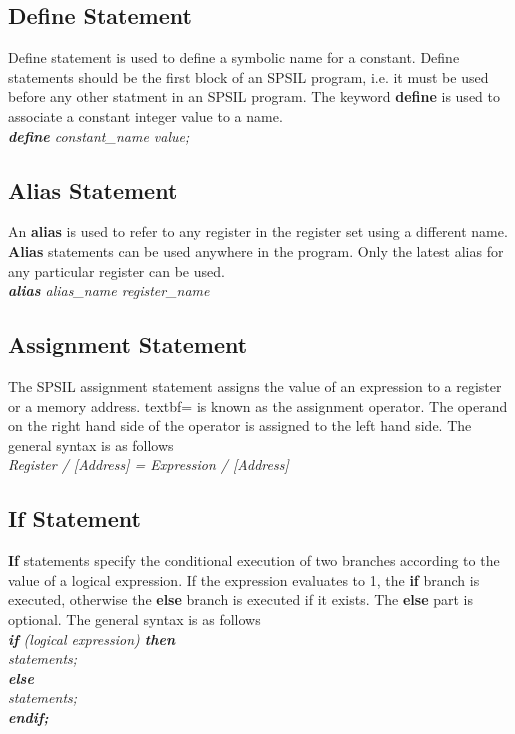 \documentclass[11pt]{article}
\begin{document}
\subsection{Define Statement}
Define statement is used to define a symbolic name for a constant. Define statements should be the first block of an SPSIL program, i.e. it must be  used before any other statment in an SPSIL program. The keyword \textbf{define} is used to associate a constant integer value to a name. \\

\textit{ \textbf{define} constant\_name value; }


\subsection{Alias Statement}
An \textbf{alias} is used to refer to any register in the register set using a different name. \textbf{Alias} statements can be used anywhere in the program. Only the latest alias for any particular register can be used.  \\
\indent \textit{ \textbf{alias}  alias\_name register\_name } \\


\subsection{Assignment Statement}
The SPSIL assignment statement assigns the value of an expression to a register  or a memory address. textbf{=} is known as the assignment operator. The operand on the right hand side of the operator is assigned to the left hand side. The general syntax is as follows \\

\indent \textit{ Register / [Address] = Expression / [Address] }


\subsection{If Statement}
\textbf{If} statements specify the conditional execution of two branches according to the value of a logical expression. If the expression evaluates to 1, the \textbf{if} branch is executed, otherwise the \textbf{else}  branch is executed if it exists. The \textbf{else} part is optional. The general syntax is as follows  \\

\textit{
\textbf{if} (logical expression) \textbf{then}  \\
 \indent \indent statements; \\
\indent \textbf{else} \\
\indent  \indent statements; \\
\indent \textbf{endif;}  \\
}
\end{document}
